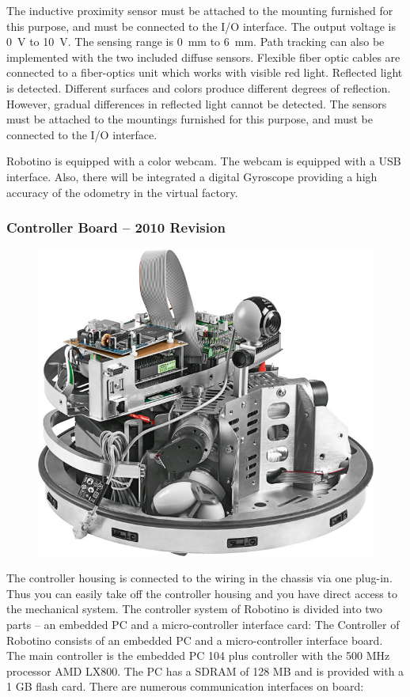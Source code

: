 \documentclass[12pt,twoside]{article}
\begin{document}
\begin{appendix}
The inductive proximity sensor must be attached to the mounting
furnished for this purpose, and must be connected to the I/O
interface.  The output voltage is \SI{0}{\volt} to \SI{10}{\volt}. The
sensing range is \SI{0}{\milli\metre} to \SI{6}{\milli\metre}. Path
tracking can also be implemented with the two included diffuse
sensors.  Flexible fiber optic cables are connected to a fiber-optics
unit which works with visible red light. Reflected light is
detected. Different surfaces and colors produce different degrees of
reflection. However, gradual differences in reflected light cannot be
detected. The sensors must be attached to the mountings furnished for
this purpose, and must be connected to the I/O interface.

Robotino is equipped with a color webcam. The webcam is equipped with
a USB interface. Also, there will be integrated a digital Gyroscope
providing a high accuracy of the odometry in the virtual factory.

\subsubsection{Controller Board – 2010 Revision}

\begin{figure}[h]
\centering
\includegraphics[width=.5\textwidth]{RobotinoOpen.jpg}
\label{apx:fig:robotinoopen}
\end{figure}


The controller housing is connected to the wiring in the chassis via
one plug-in. Thus you can easily take off the controller housing and
you have direct access to the mechanical system. The controller system
of Robotino is divided into two parts – an embedded PC and a
micro-controller interface card: The Controller of Robotino consists of
an embedded PC and a micro-controller interface board. The main
controller is the embedded PC 104 plus controller with the 500 MHz
processor AMD LX800. The PC has a SDRAM of 128 MB and is provided with
a 1 GB flash card. There are numerous communication interfaces on
board:


\end{appendix}
\end{document}
